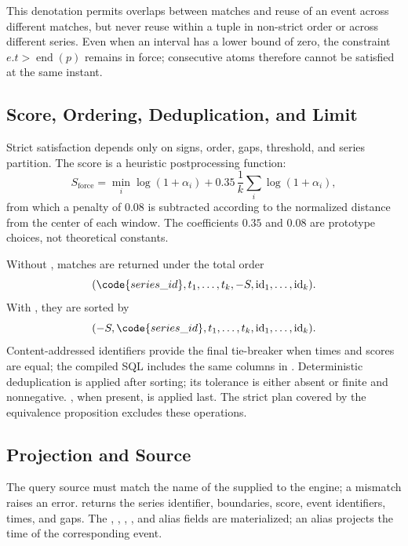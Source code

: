 This denotation permits overlaps between matches and reuse of an event across different matches, but never reuse within a tuple in non-strict order or across different series. Even when an interval has a lower bound of zero, the constraint $e.t>\operatorname{end}(p)$ remains in force; consecutive atoms therefore cannot be satisfied at the same instant.

\subsection{Score, Ordering, Deduplication, and Limit}

Strict satisfaction depends only on signs, order, gaps, threshold, and series partition. The score is a heuristic postprocessing function:
\begin{equation}
 S_{\mathrm{force}}=\min_i\log(1+\alpha_i)
 +0.35\,\frac{1}{k}\sum_i\log(1+\alpha_i),
\end{equation}
from which a penalty of $0.08$ is subtracted according to the normalized distance from the center of each window. The coefficients $0.35$ and $0.08$ are prototype choices, not theoretical constants.

Without , matches are returned under the total order
\begin{equation*}
 (\code{series\_id},t_1,\ldots,t_k,-S,\mathrm{id}_1,\ldots,\mathrm{id}_k).
\end{equation*}
With , they are sorted by
\begin{equation*}
 (-S,\code{series\_id},t_1,\ldots,t_k,\mathrm{id}_1,\ldots,\mathrm{id}_k).
\end{equation*}
Content-addressed identifiers provide the final tie-breaker when times and scores are equal; the compiled SQL includes the same columns in . Deterministic deduplication is applied after sorting; its tolerance is either absent or finite and nonnegative. , when present, is applied last. The strict plan covered by the equivalence proposition excludes these operations.

\subsection{Projection and Source}

The query source must match the name of the  supplied to the engine; a mismatch raises an error.  returns the series identifier, boundaries, score, event identifiers, times, and gaps. The , , , , and alias fields are materialized; an alias projects the time of the corresponding event.

